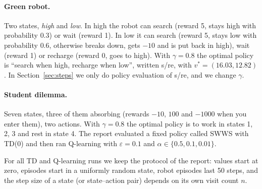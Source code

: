 \paragraph{Green robot.} Two states, \emph{high} and \emph{low}. In high the robot can search (reward 5, stays high with probability $0.3$) or wait (reward 1). In low it can search (reward 5, stays low with probability $0.6$, otherwise breaks down, gets $-10$ and is put back in high), wait (reward 1) or recharge (reward 0, goes to high). With $\gamma = 0.8$ the optimal policy is ``search when high, recharge when low'', written s/re, with $v^* = (16.03, 12.82)$. In Section~\ref{sec:steps} we only do policy evaluation of s/re, and we change $\gamma$.

\paragraph{Student dilemma.} Seven states, three of them absorbing (rewards $-10$, $100$ and $-1000$ when you enter them), two actions. With $\gamma = 0.8$ the optimal policy is to work in states 1, 2, 3 and rest in state 4. The report evaluated a fixed policy called SWWS with TD(0) and then ran Q-learning with $\varepsilon = 0.1$ and $\alpha \in \{0.5, 0.1, 0.01\}$.

For all TD and Q-learning runs we keep the protocol of the report: values start at zero, episodes start in a uniformly random state, robot episodes last 50 steps, and the step size of a state (or state--action pair) depends on its own visit count $n$.
